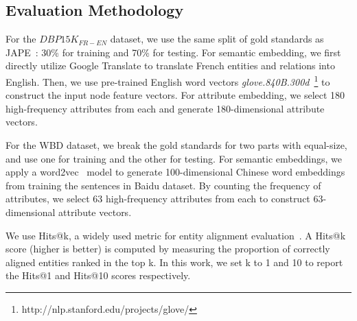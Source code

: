 	
	



	\subsection{Evaluation Methodology}
    	For the $DBP15K_{FR-EN}$ dataset, we use the same split of gold standards as JAPE~\cite{sun2017cross}: 30\% for training and 70\% for
    testing.
	For semantic embedding, we first directly utilize Google Translate to translate French entities and relations into English.
	Then, we use pre-trained English word vectors \emph{glove.840B.300d}~\footnote{http://nlp.stanford.edu/projects/glove/} to construct the input node feature vectors.
	For attribute embedding, we select 180 high-frequency attributes from each \KG and generate 180-dimensional attribute vectors.	


	For the WBD dataset, we break the gold standards for two parts with equal-size, and use one for training and the other for testing.
	For semantic embeddings, we apply a word2vec~\cite{Mikolov2013Efficient} model to generate 100-dimensional Chinese word embeddings from training the sentences in Baidu dataset.
	By counting the frequency of attributes, we select 63 high-frequency attributes from each \KG to construct 63-dimensional attribute vectors.



	
 	We use Hits@k, a widely used metric for entity
 alignment evaluation~\cite{hao2016joint,chen2016multilingual,sun2017cross,zhu2017iterative}. A Hits@k score (higher is better) is computed by
 measuring the proportion of correctly aligned entities ranked in the top k. In this work, we set k to 1 and 10 to report the Hits@1 and Hits@10 scores
  respectively.
	
	
